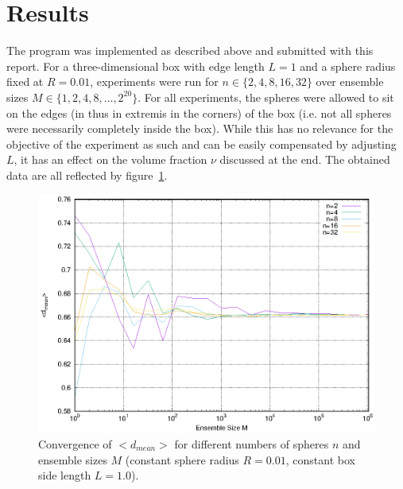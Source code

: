 \documentclass[11pt,a4paper]{article}
\begin{document}
\section{Results}


The program was implemented as described above and submitted with this report. 
For a three-dimensional box with edge length $L=1$ and a sphere radius fixed at $R = 0.01$, experiments were run for $n \in \{2, 4, 8, 16, 32\}$ over ensemble
sizes $M \in \{1, 2, 4, 8, \ldots, 2^{20}\}$. For all experiments, the spheres were allowed to sit on the edges (in thus in extremis in the corners)
of the box (i.e. not all spheres were necessarily completely inside the box). While this has no relevance for the objective of the experiment
as such and can be easily compensated by adjusting $L$, it has an effect on the volume fraction $\nu$ discussed at the end.
The obtained data are all reflected by figure~\ref{fig:1}.

\begin{figure}[ht]
\begin{center}
\includegraphics[scale=0.9]{figure1.eps} 
\end{center}
\caption{Convergence of $<d_{mean}>$ for different numbers of spheres $n$ and ensemble sizes $M$ (constant sphere radius $R=0.01$, constant box side length $L=1.0$).}
\label{fig:1}
\end{figure}
\end{document}
